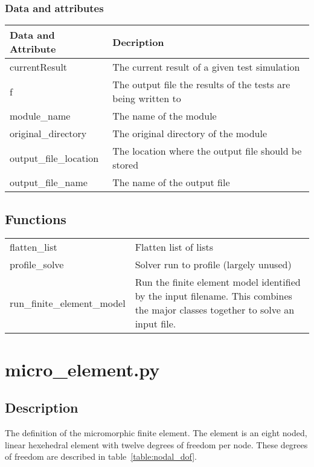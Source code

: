 \documentclass{asme2ej}
\begin{document}
\subsubsection{Data and attributes}
\begin{longtable}{ p{}  p{} }
\hline
Data and Attribute & Decription\\
\hline
\hline
currentResult & The current result of a given test simulation\\
f & The output file the results of the tests are being written to\\
module\_name & The name of the module\\
original\_directory & The original directory of the module\\
output\_file\_location & The location where the output file should be stored\\
output\_file\_name & The name of the output file\\
\hline
\end{longtable}

\subsection{Functions}
\begin{longtable}{ p{} p{} }
flatten\_list & Flatten list of lists\\
profile\_solve & Solver run to profile (largely unused)\\
run\_finite\_element\_model & Run the finite element model identified by the input filename. This combines the major classes together to solve an input file.
\end{longtable}

\clearpage
\section{micro\_element.py}

\subsection{Description}

The definition of the micromorphic finite element. The element is an eight noded, linear hexehedral element with twelve degrees of freedom per node. These degrees of freedom are described in table~\ref{table:nodal_dof}.
\end{document}
